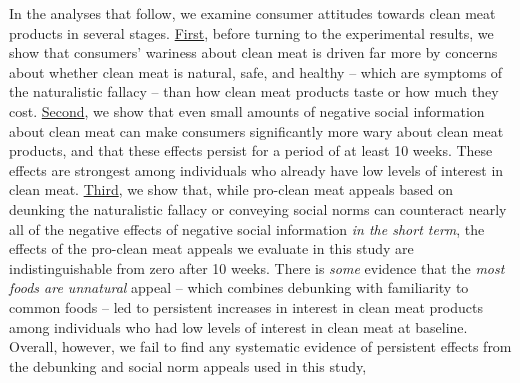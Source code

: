 \documentclass[12pt]{article}
\begin{document}
In the analyses that follow, we examine consumer attitudes towards clean meat products in several stages. \underline{First}, before turning to the experimental results, we show that consumers' wariness about clean meat is driven far more by concerns about whether clean meat is natural, safe, and healthy -- which are symptoms of the naturalistic fallacy -- than how clean meat products taste or how much they cost.
\underline{Second}, we show that even small amounts of negative social information about clean meat can make consumers significantly more wary about clean meat products, and that these effects persist for a period of at least 10 weeks. These effects are strongest among individuals who already have low levels of interest in clean meat.
\underline{Third}, we show that, while pro-clean meat appeals based on deunking the naturalistic fallacy or conveying social norms can counteract nearly all of the negative effects of negative social information \textit{in the short term}, the effects of the pro-clean meat appeals we evaluate in this study are indistinguishable from zero after 10 weeks. There is \textit{some} evidence that the \textit{most foods are unnatural} appeal -- which combines debunking with familiarity to common foods -- led to persistent increases in interest in clean meat products among individuals who had low levels of interest in clean meat at baseline. Overall, however, we fail to find any systematic evidence of persistent effects from the debunking and social norm appeals used in this study,


\end{document}
